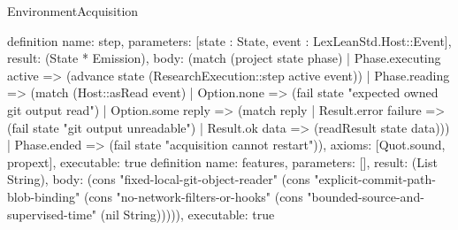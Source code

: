 \begin{lexlean}{EnvironmentAcquisition}
\begin{semanticmodule}
{}
definition{
 name: step, parameters: [state : State, event : LexLeanStd.Host::Event], result: (State * Emission),
 body: (match (project state phase) | Phase.executing active => (advance state (ResearchExecution::step active event)) | Phase.reading => (match (Host::asRead event) | Option.none => (fail state "expected owned git output read") | Option.some reply => (match reply | Result.error failure => (fail state "git output unreadable") | Result.ok data => (readResult state data))) | Phase.ended => (fail state "acquisition cannot restart")), axioms: [Quot.sound, propext], executable: true
}
definition{
 name: features, parameters: [], result: (List String),
 body: (cons "fixed-local-git-object-reader" (cons "explicit-commit-path-blob-binding" (cons "no-network-filters-or-hooks" (cons "bounded-source-and-supervised-time" (nil String))))), executable: true
}
\end{semanticmodule}
\end{lexlean}
